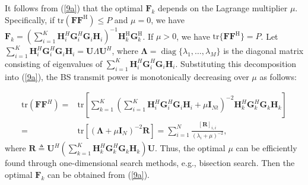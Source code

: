 \documentclass[journal]{IEEEtran}
\begin{document}
It follows from (\ref{9a}) that the optimal $\mathbf {F}_{k}$ depends on the Lagrange multiplier $\mu$. Specifically, if  ${\mathrm {tr}} ( {\mathbf{F}} {\mathbf{F}}^{\mathrm {H}}) 
\le P$ and $\mu=0$, we have $\mathbf {F}_{k} = (\sum _{i = 1}^{K}{\mathbf {H}_{i}^{H} \mathbf {G}_{i}^{H} \mathbf {G}_{i} \mathbf {H}_{i}} )^{-1}  \mathbf {H}_{k}^{\mathrm{H}}\mathbf {G}_{k}^{\mathrm{H}}$.
If $\mu>0$, we have $\mathrm {tr} \lbrace{ {\mathbf{F}} {\mathbf{F}}^{\mathrm {H}}} \rbrace = P$.
Let $\sum _{i = 1}^{K}{\mathbf {H}_{i}^{H} \mathbf {G}_{i}^{H} \mathbf {G}_{i} \mathbf {H}_{i}}=\mathbf {U}{\Lambda }\mathbf {U}^{H}$, where $\boldsymbol{\Lambda }=\mathop {\mathrm {diag}}\nolimits \{\lambda_{1},\ldots,\lambda_{M}\}$ is the diagonal matrix consisting of eigenvalues  of
   $\sum _{i = 1}^{K}{\mathbf {H}_{i}^{H} \mathbf {G}_{i}^{H} \mathbf {G}_{i} \mathbf {H}_{i}}$.
   Substituting  this decomposition into (\ref{9a}), the BS transmit power is monotonically decreasing over $\mu$ as follows:

\vspace{-4mm}
   
  \begin{equation} \begin{aligned} {\mathrm {tr}} (\mathbf {F}\mathbf {F}^{H})
   =&{\mathrm {tr}} [\sum _{k = 1}^{K} (\sum _{i = 1}^{K}{\mathbf {H}_{i}^{H} \mathbf {G}_{i}^{H} \mathbf {G}_{i} \mathbf {H}_{i} + \mu \mathbf {I}_{Nt} })^{-2} { \mathbf {H}_{k}^{H}\mathbf {G}_{k}^{H}\mathbf {G}_{k} \mathbf {H}_{k} }] \\
       =&{\mathrm {tr}}  [{  ({\boldsymbol{\Lambda } + {\mu } \mathbf {I}_{N} })^{-2} \mathbf {R} }] = \sum _{i=1}^{N} \frac {[\mathbf {R}]_{i,i}}{(\lambda _{i} + {\mu })^{-2}},\label{10}\end{aligned}\end{equation}
   where $\mathbf {R}\triangleq\mathbf {U}^{H}(\sum _{k = 1}^{K}{ \mathbf {H}_{k}^{H}\mathbf {G}_{k}^{H}\mathbf {G}_{k} \mathbf {H}_{k} })\mathbf {U}$.
   Thus, the optimal  $\mu$ can be efficiently found through one-dimensional search methods, e.g., bisection search\cite{shi2011iteratively}. Then the optimal $\mathbf {F}_{k}$ can be obtained from (\ref{9a}).

\vspace{-3mm}
   
\end{document}
